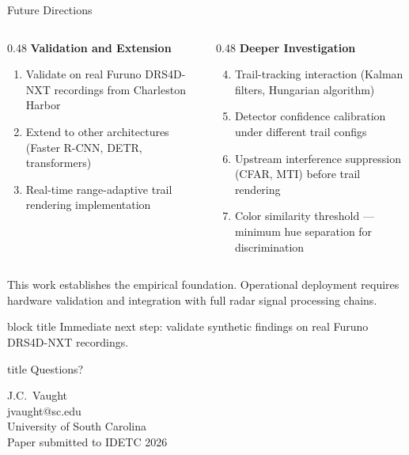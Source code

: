 \documentclass[aspectratio=169, 10pt]{beamer}
\newcommand{\keypoint}[1]{%
  \vfill
  \begin{beamercolorbox}[wd=\textwidth, dp=0.4em, leftskip=0.3cm]{block title}%
    \small #1%
  \end{beamercolorbox}%
}
\begin{document}
\begin{frame}{Future Directions}

\begin{columns}[T]
\begin{column}{0.48\textwidth}
  \textcolor{Garnet}{\textbf{Validation and Extension}}
  \begin{enumerate}
    \item Validate on real Furuno DRS4D-NXT recordings from Charleston Harbor
    \item Extend to other architectures (Faster R-CNN, DETR, transformers)
    \item Real-time range-adaptive trail rendering implementation
  \end{enumerate}
\end{column}
\begin{column}{0.48\textwidth}
  \textcolor{Atlantic}{\textbf{Deeper Investigation}}
  \begin{enumerate}
    \setcounter{enumi}{3}
    \item Trail-tracking interaction (Kalman filters, Hungarian algorithm)
    \item Detector confidence calibration under different trail configs
    \item Upstream interference suppression (CFAR, MTI) before trail rendering
    \item Color similarity threshold --- minimum hue separation for discrimination
  \end{enumerate}
\end{column}
\end{columns}

This work establishes the empirical foundation. Operational deployment requires
hardware validation and integration with full radar signal processing chains.

\keypoint{Immediate next step: validate synthetic findings on real Furuno DRS4D-NXT recordings.}
\end{frame}

{
\begin{frame}[plain]
\vfill
\begin{beamercolorbox}[wd=\paperwidth, ht=3em, dp=1em, leftskip=1cm]{title}
  Questions?
\end{beamercolorbox}
\vfill
\begin{center}
  {\large J.C.\ Vaught}\\[0.3em]
  {\normalsize jvaught@sc.edu}\\[0.3em]
  {\small University of South Carolina}\\[0.5em]
  {\footnotesize Paper submitted to IDETC 2026}
\end{center}
\vfill
\end{frame}
}
\end{document}
